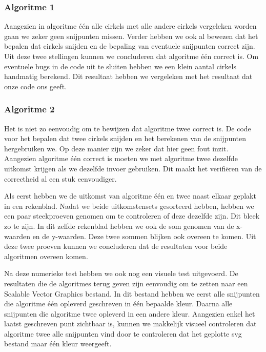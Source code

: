 \documentclass[11pt,a4paper]{article}
\begin{document}
\subsubsection*{Algoritme 1}

Aangezien in algoritme \'e\'en alle cirkels met alle andere cirkels vergeleken worden gaan we zeker geen snijpunten missen. Verder hebben we ook al bewezen dat het bepalen dat cirkels snijden en de bepaling van eventuele snijpunten correct zijn. Uit deze twee stellingen kunnen we concluderen dat algoritme \'e\'en correct is.
Om eventuele bugs in de code uit te sluiten hebben we een klein aantal cirkels handmatig berekend. Dit resultaat hebben we vergeleken met het resultaat dat onze code ons geeft.

\subsubsection*{Algoritme 2}


Het is niet zo eenvoudig om te bewijzen dat algoritme twee correct is. De code voor het bepalen dat twee cirkels snijden en het berekenen van de snijpunten hergebruiken we. Op deze manier zijn we zeker dat hier geen fout inzit.
Aangezien algoritme \'e\'en correct is moeten we met algoritme twee dezelfde uitkomst krijgen als we dezelfde invoer gebruiken. Dit maakt het verifi\"eren van de correctheid al een stuk eenvoudiger.

Als eerst hebben we de uitkomst van algoritme \'e\'en en twee naast elkaar geplakt in een rekenblad. Nadat we beide uitkomstensets gesorteerd hebben, hebben we een paar steekproeven genomen om te controleren of deze dezelfde zijn. Dit bleek zo te zijn. In dit zelfde rekenblad hebben we ook de som genomen van de x-waarden en de y-waarden. Deze twee sommen blijken ook overeen te komen. Uit deze twee proeven kunnen we concluderen dat de resultaten voor beide algoritmen overeen komen.

Na deze numerieke test hebben we ook nog een visuele test uitgevoerd. De resultaten die de algoritmes terug geven zijn eenvoudig om te zetten naar een Scalable Vector Graphics bestand. In dit bestand hebben we eerst alle snijpunten die algoritme \'e\'en opleverd geschreven in \'e\'en bepaalde kleur. Daarna alle snijpunten die algoritme twee opleverd in een andere kleur. Aangezien enkel het laatst geschreven punt zichtbaar is, kunnen we makkelijk visueel controleren dat algoritme twee alle snijpunten vind door te controleren dat het geplotte svg bestand maar \'e\'en kleur weergeeft.
\end{document}
